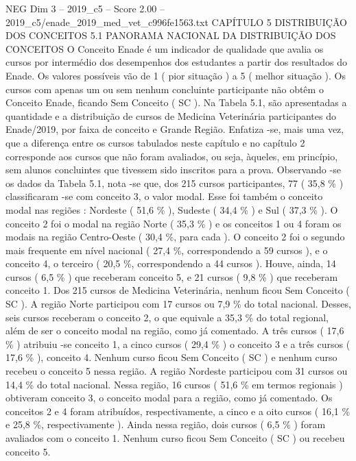 \begin{textsample}{NEG Dim 3 – 2019\_c5 – Score 2.00 – 2019\_c5/enade\_2019\_med\_vet\_c996fe1563.txt}  \label{ex:f3_neg_190}
CAPÍTULO 5 DISTRIBUIÇÃO DOS CONCEITOS 5.1 PANORAMA NACIONAL DA DISTRIBUIÇÃO DOS CONCEITOS O Conceito Enade é um indicador de qualidade que avalia os cursos por intermédio dos desempenhos dos estudantes a partir dos resultados do Enade.
Os valores possíveis vão de 1 ( pior situação ) a 5 ( melhor situação ).
Os cursos com apenas um ou sem nenhum concluinte participante não obtêm o Conceito Enade, ficando Sem Conceito ( SC ).
Na Tabela 5.1, são apresentadas a quantidade e a distribuição de cursos de Medicina Veterinária participantes do Enade/2019, por faixa de conceito e Grande Região.
Enfatiza -se, mais uma vez, que a diferença entre os cursos tabulados neste capítulo e no capítulo 2 corresponde aos cursos que não foram avaliados, ou seja, àqueles, em princípio, sem alunos concluintes que tivessem sido inscritos para a prova.
Observando -se os dados da Tabela 5.1, nota -se que, dos 215 cursos participantes, 77 ( 35,8 \% ) classificaram -se com conceito 3, o valor modal.
Esse foi também o conceito modal nas regiões : Nordeste ( 51,6 \% ), Sudeste ( 34,4 \% ) e Sul ( 37,3 \% ).
O conceito 2 foi o modal na região Norte ( 35,3 \% ) e os conceitos 1 ou 4 foram os modais na região Centro-Oeste ( 30,4 \%, para cada ).
O conceito 2 foi o segundo mais frequente em nível nacional ( 27,4 \%, correspondendo a 59 cursos ), e o conceito 4, o terceiro ( 20,5 \%, correspondendo a 44 cursos ).
Houve, ainda, 14 cursos ( 6,5 \% ) que receberam conceito 5, e 21 cursos ( 9,8 \% ) que receberam conceito 1.
Dos 215 cursos de Medicina Veterinária, nenhum ficou Sem Conceito ( SC ).
A região Norte participou com 17 cursos ou 7,9 \% do total nacional.
Desses, seis cursos receberam o conceito 2, o que equivale a 35,3 \% do total regional, além de ser o conceito modal na região, como já comentado.
A três cursos ( 17,6 \% ) atribuiu -se conceito 1, a cinco cursos ( 29,4 \% ) o conceito 3 e a três cursos ( 17,6 \% ), conceito 4.
Nenhum curso ficou Sem Conceito ( SC ) e nenhum curso recebeu o conceito 5 nessa região.
A região Nordeste participou com 31 cursos ou 14,4 \% do total nacional.
Nessa região, 16 cursos ( 51,6 \% em termos regionais ) obtiveram conceito 3, o conceito modal para a região, como já comentado.
Os conceitos 2 e 4 foram atribuídos, respectivamente, a cinco e a oito cursos ( 16,1 \% e 25,8 \%, respectivamente ).
Ainda nessa região, dois cursos ( 6,5 \% ) foram avaliados com o conceito 1.
Nenhum curso ficou Sem Conceito ( SC ) ou recebeu conceito 5.

\end{textsample}
